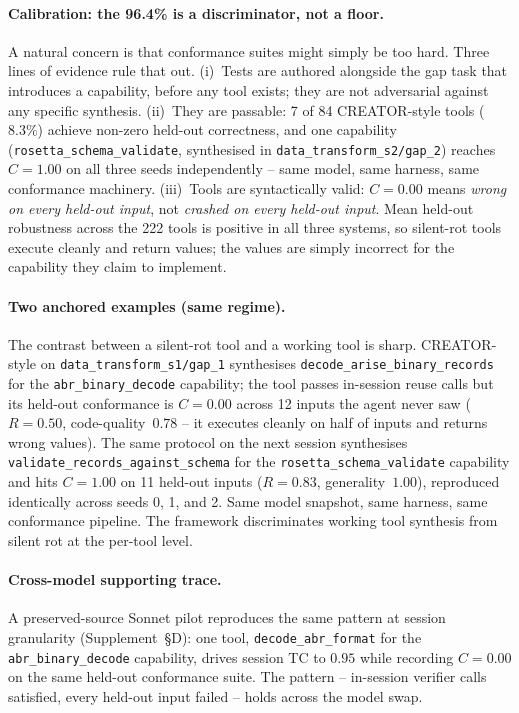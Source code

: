 \documentclass[sigconf,anonymous,review,natbib=false]{acmart}
\begin{document}
\paragraph{Calibration: the 96.4\% is a discriminator, not a floor.}
A natural concern is that conformance suites might simply be too hard. Three lines of evidence rule that out. (i)~Tests are authored alongside the gap task that introduces a capability, before any tool exists; they are not adversarial against any specific synthesis. (ii)~They are passable: 7 of 84 CREATOR-style tools ($8.3\%$) achieve non-zero held-out correctness, and one capability (\texttt{rosetta\_schema\_validate}, synthesised in \texttt{data\_transform\_s2/gap\_2}) reaches $C{=}1.00$ on all three seeds independently -- same model, same harness, same conformance machinery. (iii)~Tools are syntactically valid: $C{=}0.00$ means \emph{wrong on every held-out input}, not \emph{crashed on every held-out input}. Mean held-out robustness across the 222 tools is positive in all three systems, so silent-rot tools execute cleanly and return values; the values are simply incorrect for the capability they claim to implement.

\paragraph{Two anchored examples (same regime).}
The contrast between a silent-rot tool and a working tool is sharp. CREATOR-style on \texttt{data\_transform\_s1/gap\_1} synthesises \texttt{decode\_arise\_binary\_records} for the \texttt{abr\_binary\_decode} capability; the tool passes in-session reuse calls but its held-out conformance is $C{=}0.00$ across 12 inputs the agent never saw ($R{=}0.50$, code-quality~$0.78$ -- it executes cleanly on half of inputs and returns wrong values). The same protocol on the next session synthesises \texttt{validate\_records\_against\_schema} for the \texttt{rosetta\_schema\_validate} capability and hits $C{=}1.00$ on 11 held-out inputs ($R{=}0.83$, generality~$1.00$), reproduced identically across seeds 0, 1, and 2. Same model snapshot, same harness, same conformance pipeline. The framework discriminates working tool synthesis from silent rot at the per-tool level.

\paragraph{Cross-model supporting trace.} A preserved-source Sonnet pilot reproduces the same pattern at session granularity (Supplement~\S D): one tool, \texttt{decode\_abr\_format} for the \texttt{abr\_binary\_decode} capability, drives session TC to $0.95$ while recording $C{=}0.00$ on the same held-out conformance suite. The pattern -- in-session verifier calls satisfied, every held-out input failed -- holds across the model swap.
\end{document}

